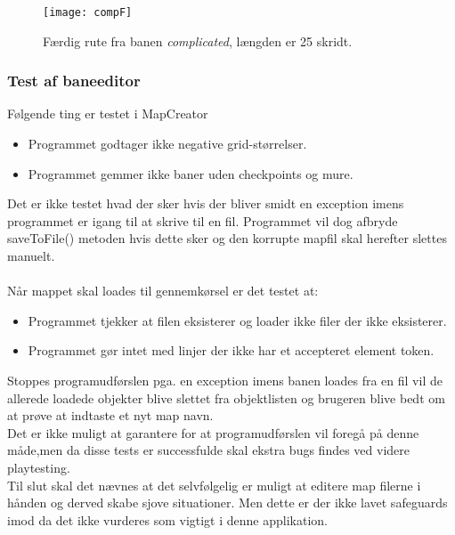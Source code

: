 \begin{figure}[h!]
	\centering
	\texttt{[image: compF]}
		\caption{Færdig rute fra banen \emph{complicated}, længden er 25 skridt.}\label{fig:compF}
\end{figure}

\clearpage

\subsubsection{Test af baneeditor}
Følgende ting er testet i MapCreator
\begin{itemize}
\item Programmet godtager ikke negative grid-størrelser.
\item Programmet gemmer ikke baner uden checkpoints og mure.
\end{itemize}

Det er ikke testet hvad der sker hvis der bliver smidt en exception imens programmet er igang til at skrive til en fil. Programmet vil dog afbryde saveToFile() metoden hvis dette sker og den korrupte mapfil skal herefter slettes manuelt.\\
\\
Når mappet skal loades til gennemkørsel er det testet at:
\begin{itemize}
\item Programmet tjekker at filen eksisterer og loader ikke filer der ikke eksisterer.
\item Programmet gør intet med linjer der ikke har et accepteret element token.
\end{itemize}
Stoppes programudførslen pga. en exception imens banen loades fra en fil vil de allerede loadede objekter blive slettet fra objektlisten og brugeren blive bedt om at prøve at indtaste et nyt map navn.\\
Det er ikke muligt at garantere for at programudførslen vil foregå på denne måde,men da disse tests er successfulde skal ekstra bugs findes ved videre playtesting.
\\
Til slut skal det nævnes at det selvfølgelig er muligt at editere map filerne i hånden og derved skabe sjove situationer. Men dette er der ikke lavet safeguards imod da det ikke vurderes som vigtigt i denne applikation.
